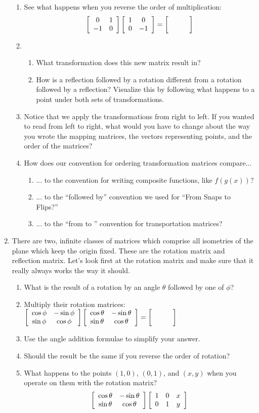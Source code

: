 \documentclass[../gatm.tex]{subfiles}
\begin{document}
\begin{enumerate}
\begin{enumerate}
\item See what happens when you reverse the order of multiplication: \label{prob:cm_fill_in_blank_end}
$$\twomat{0}{1}{-1}{0}\twomat{1}{0}{0}{-1}=\blanktwomat$$
\item \begin{enumerate}
\item What transformation does this new matrix result in?
\item How is a reflection followed by a rotation different from a rotation followed by a reflection? Visualize this by following what happens to a point under both sets of transformations.
\end{enumerate}
\item Notice that we apply the transformations from right to left. If you wanted to read from left to right, what would you have to change about the way you wrote the mapping matrices, the vectors representing points, and the order of the matrices?
\item How does our convention for ordering transformation matrices compare...
\begin{enumerate}
\item ... to the convention for writing composite functions, like $f(g(x))$?
\item ... to the ``followed by'' convention we used for ``From Snaps to Flips?''
\item ... to the ``from \underline{\phantom{egg}} to \underline{\phantom{egg}}'' convention for transportation matrices?
\end{enumerate}
\end{enumerate}
\item There are two, infinite classes of matrices which comprise all isometries of the plane which keep the origin fixed. These are the rotation matrix and reflection matrix. Let's look first at the rotation matrix and make sure that it really always works the way it should.
\begin{enumerate}
\item What is the result of a rotation by an angle $\theta$ followed by one of $\phi$?
\item Multiply their rotation matrices: $\twomat{\cos \phi}{-\sin \phi}{\sin\phi}{\cos\phi} \twomat{\cos \theta}{-\sin \theta}{\sin\theta}{\cos\theta}=\blanktwomat$
\item Use the angle addition formulae to simplify your answer.
\item Should the result be the same if you reverse the order of rotation?
\item What happens to the points $(1,0)$, $(0,1)$, and $(x,y)$ when you operate on them with the rotation matrix? $$\left[\begin{array}{cc} \cos \theta & -\sin \theta \\ \sin\theta & \cos\theta \end{array}\right]\left[\begin{array}{ccc} 1 & 0 & x \\ 0 & 1 & y \end{array}\right]$$

\end{enumerate}
\end{enumerate}
\end{document}
